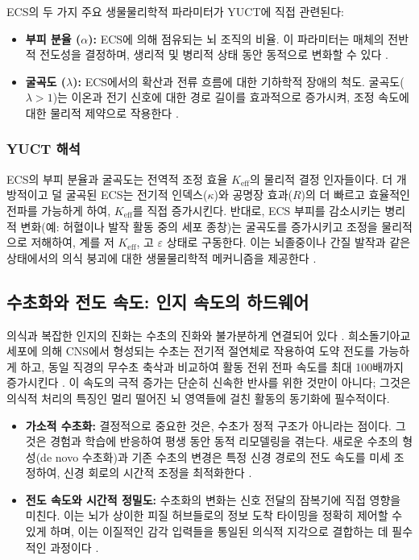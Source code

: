 \documentclass[12pt,a4paper]{article}
\begin{document}
	ECS의 두 가지 주요 생물물리학적 파라미터가 YUCT에 직접 관련된다:
	
	\begin{itemize}
		\item \textbf{부피 분율 (\(\alpha\)):} ECS에 의해 점유되는 뇌 조직의 비율. 이 파라미터는 매체의 전반적 전도성을 결정하며, 생리적 및 병리적 상태 동안 동적으로 변화할 수 있다 \cite{Sykova2008}.
		\item \textbf{굴곡도 (\(\lambda\)):} ECS에서의 확산과 전류 흐름에 대한 기하학적 장애의 척도. 굴곡도(\(\lambda > 1\))는 이온과 전기 신호에 대한 경로 길이를 효과적으로 증가시켜, 조정 속도에 대한 물리적 제약으로 작용한다 \cite{Nicholson2006}.
	\end{itemize}
	
	\subsubsection*{YUCT 해석}
	ECS의 부피 분율과 굴곡도는 전역적 조정 효율 \(K_{\mathrm{eff}}\)의 물리적 결정 인자들이다. 더 개방적이고 덜 굴곡된 ECS는 전기적 인덱스(\(\kappa\))와 공명장 효과(\(R\))의 더 빠르고 효율적인 전파를 가능하게 하여, \(K_{\mathrm{eff}}\)를 직접 증가시킨다. 반대로, ECS 부피를 감소시키는 병리적 변화(예: 허혈이나 발작 활동 중의 세포 종창)는 굴곡도를 증가시키고 조정을 물리적으로 저해하여, 계를 저 \(K_{\mathrm{eff}}\), 고 \(\varepsilon\) 상태로 구동한다. 이는 뇌졸중이나 간질 발작과 같은 상태에서의 의식 붕괴에 대한 생물물리학적 메커니즘을 제공한다 \cite{Arranz2023}.
	
	\subsection{수초화와 전도 속도: 인지 속도의 하드웨어}
	
	의식과 복잡한 인지의 진화는 수초의 진화와 불가분하게 연결되어 있다 \cite{Fields2008}. 희소돌기아교세포에 의해 CNS에서 형성되는 수초는 전기적 절연체로 작용하여 도약 전도를 가능하게 하고, 동일 직경의 무수초 축삭과 비교하여 활동 전위 전파 속도를 최대 100배까지 증가시킨다 \cite{Waxman1980}. 이 속도의 극적 증가는 단순히 신속한 반사를 위한 것만이 아니다; 그것은 의식적 처리의 특징인 멀리 떨어진 뇌 영역들에 걸친 활동의 동기화에 필수적이다.
	
	\begin{itemize}
		\item \textbf{가소적 수초화:} 결정적으로 중요한 것은, 수초가 정적 구조가 아니라는 점이다. 그것은 경험과 학습에 반응하여 평생 동안 동적 리모델링을 겪는다. 새로운 수초의 형성(de novo 수초화)과 기존 수초의 변경은 특정 신경 경로의 전도 속도를 미세 조정하여, 신경 회로의 시간적 조정을 최적화한다 \cite{deFaria2021, Monje2023}.
		\item \textbf{전도 속도와 시간적 정밀도:} 수초화의 변화는 신호 전달의 잠복기에 직접 영향을 미친다. 이는 뇌가 상이한 피질 허브들로의 정보 도착 타이밍을 정확히 제어할 수 있게 하며, 이는 이질적인 감각 입력들을 통일된 의식적 지각으로 결합하는 데 필수적인 과정이다 \cite{Pajevic2014}.
	\end{itemize}
	
\end{document}
